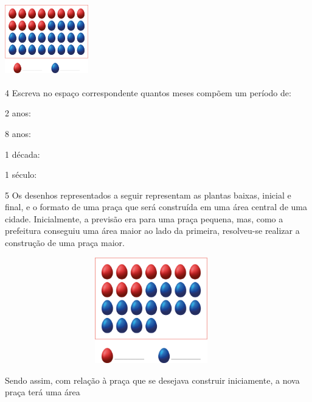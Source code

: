 \begin{mdframed}[linewidth=2pt,linecolor=salmao,roundcorner=2pt]
\includegraphics[width=1.42949in,height=1.25160in]{media/image63.png}


\begin{mdframed}[linewidth=2pt,linecolor=salmao,roundcorner=2pt]
\vspace*{1cm}
\end{mdframed}

\num{4} Escreva no espaço correspondente quantos meses compõem um período de:

\begin{escolha}
\item
  2 anos: 

\item
  8 anos: 

\item
  1 década: 

\item
  1 século: 
\end{escolha}

\num{5} Os desenhos representados a seguir representam as plantas baixas, inicial
e final, e o formato de uma praça que será construída em uma área
central de uma cidade. Inicialmente, a previsão era para uma praça
pequena, mas, como a prefeitura conseguiu uma área maior ao lado da
primeira, resolveu-se realizar a construção de uma praça maior.

\includegraphics[width=5.00877in,height=1.80849in]{media/image64.png}

Sendo assim, com relação à praça que se desejava construir iniciamente,
a nova praça terá uma área


\end{mdframed}
